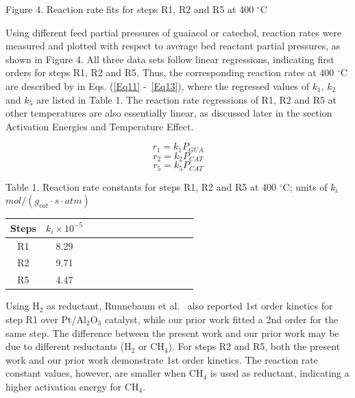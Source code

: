 \documentclass[journal=iecred,manuscript=article]{achemso}
\begin{document}
\begin{center}
\epsfxsize=400pt

Figure 4. Reaction rate fits for steps R1, R2 and R5 at 400 $^{\circ}$C
\end{center}

Using different feed partial pressures of guaiacol or catechol, 
reaction rates were measured and plotted
with respect to average bed reactant partial pressures, as shown in Figure 4.
All three data sets follow linear regressions,
indicating first orders for steps R1, R2 and R5.
Thus, the corresponding reaction rates at 400 $^{\circ}$C are described by in Eqs. (\ref{Eq11} -~\ref{Eq13}),
where the regressed values of $k_1$, $k_2$ and $k_5$ are listed in Table 1.
The reaction rate regressions of R1, R2 and R5 at other temperatures are also essentially linear,
as discussed later in the section Activation Energies and Temperature Effect.

\begin{equation} \label{Eq11}
r_1=k_1 P_{GUA}
\end{equation}
\begin{equation} \label{Eq12}
r_2=k_2 P_{CAT}
\end{equation}
\begin{equation} \label{Eq13}
r_5=k_5 P_{CAT}
\end{equation}

\begin{center}

Table 1. Reaction rate constants for steps R1, R2 and R5 at 400 $^{\circ}$C;
units of $k_i$ $mol/(g_{cat} \cdot s \cdot atm)$

\begin{tabular}{c c c c c c c c c c c c c}
\toprule
           Steps &  $k_i\times 10^{-5}$\\
\midrule
          R1 & 8.29\\
          R2 & 9.71\\
          R5 & 4.47 \\
\bottomrule
\end{tabular}
\end{center}

Using H$_2$ as reductant, Runnebaum et al.\ \cite{Runnebaum2012} also reported 1st order kinetics for step R1 over Pt/Al${_2}  $O${_3}$ catalyst, 
while our prior work \cite{Gao2015} fitted a 2nd order for the same step.
The difference between the present work and our prior work may be due to different reductants (H$_2$ or CH$_4$).
For steps R2 and R5, both the present work and our prior work demonstrate 1st order kinetics.
The reaction rate constant values, however, are smaller when CH$_4$ is used as reductant, indicating a higher activation energy for CH$_4$.
\end{document}
